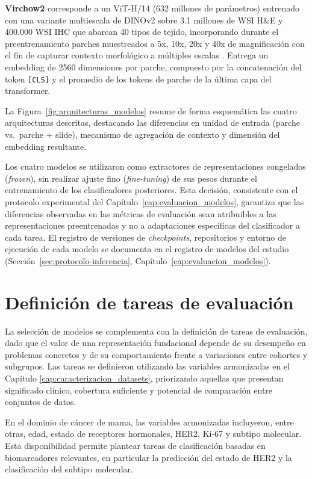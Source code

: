 \textbf{Virchow2} corresponde a un ViT-H/14 (632 millones de parámetros)
entrenado con una variante multiescala de DINOv2 sobre 3.1 millones de WSI
H\&E y 400.000 WSI IHC que abarcan 40 tipos de tejido, incorporando durante el
preentrenamiento parches muestreados a 5x, 10x, 20x y 40x de magnificación con
el fin de capturar contexto morfológico a múltiples escalas \citep{vorontsov2024virchow}.
Entrega un embedding de 2560 dimensiones por parche, compuesto por la
concatenación del token \texttt{[CLS]} y el promedio de los tokens de parche
de la última capa del transformer.

La Figura~\ref{fig:arquitecturas_modelos} resume de forma esquemática las
cuatro arquitecturas descritas, destacando las diferencias en unidad de
entrada (parche vs.\ parche + slide), mecanismo de agregación de contexto y
dimensión del embedding resultante.



Los cuatro modelos se utilizaron como extractores de representaciones congelados (\textit{frozen}), sin realizar ajuste fino (\textit{fine-tuning}) de sus pesos durante el entrenamiento de los clasificadores posteriores. Esta decisión, consistente con el protocolo experimental del Capítulo~\ref{cap:evaluacion_modelos}, garantiza que las diferencias observadas en las métricas de evaluación sean atribuibles a las representaciones preentrenadas y no a adaptaciones específicas del clasificador a cada tarea. El registro de versiones de \textit{checkpoints}, repositorios y entorno de ejecución de cada modelo se documenta en el registro de modelos del estudio (Sección~\ref{sec:protocolo-inferencia}, Capítulo~\ref{cap:evaluacion_modelos}).

\section{Definición de tareas de evaluación}
\label{sec:definicion_tareas}

La selección de modelos se complementa con la definición de tareas de evaluación, dado que el valor de una representación fundacional depende de su desempeño en problemas concretos y de su comportamiento frente a variaciones entre cohortes y subgrupos. Las tareas se definieron utilizando las variables armonizadas en el Capítulo \ref{cap:caracterizacion_datasets}, priorizando aquellas que presentan significado clínico, cobertura suficiente y potencial de comparación entre conjuntos de datos.

En el dominio de cáncer de mama, las variables armonizadas incluyeron, entre otras, edad, estado de receptores hormonales, HER2, Ki-67 y subtipo molecular. Esta disponibilidad permite plantear tareas de clasificación basadas en biomarcadores relevantes, en particular la predicción del estado de HER2 y la clasificación del subtipo molecular.

